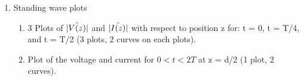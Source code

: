 \documentclass{article}
\begin{document}
\begin{enumerate}
    \item Standing wave plots
    \begin{enumerate}
        \item 3 Plots of $\Tilde{|V(z)|}$ and $\Tilde{|I(z)|}$ with respect to position z for: t = 0, t = T/4, and t = T/2 (3 plots, 2 curves on each plots). 
        \begin{center}
        \end{center}
        \item Plot of the voltage and current for $0 < t < 2T$ at z = d/2 (1 plot, 2 curves).
        \begin{center}
        \end{center}
    \end{enumerate}

\end{enumerate}
\end{document}
